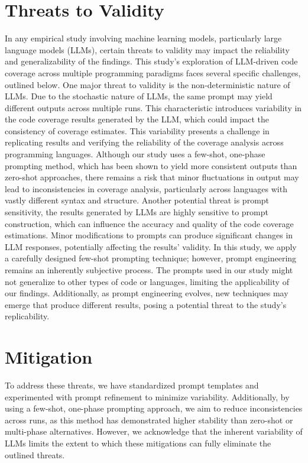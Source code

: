 \documentclass[sigconf]{acmart}
\begin{document}
\section{Threats to Validity}
In any empirical study involving machine learning models, particularly large language models (LLMs), certain threats to validity may impact the reliability and generalizability of the findings. This study’s exploration of LLM-driven code coverage across multiple programming paradigms faces several specific challenges, outlined below. One major threat to validity is the non-deterministic nature of LLMs. Due to the stochastic nature of LLMs, the same prompt may yield different outputs across multiple runs. This characteristic introduces variability in the code coverage results generated by the LLM, which could impact the consistency of coverage estimates. This variability presents a challenge in replicating results and verifying the reliability of the coverage analysis across programming languages. Although our study uses a few-shot, one-phase prompting method, which has been shown to yield more consistent outputs than zero-shot approaches, there remains a risk that minor fluctuations in output may lead to inconsistencies in coverage analysis, particularly across languages with vastly different syntax and structure. Another potential threat is prompt sensitivity, the results generated by LLMs are highly sensitive to prompt construction, which can influence the accuracy and quality of the code coverage estimations. Minor modifications to prompts can produce significant changes in LLM responses, potentially affecting the results’ validity. In this study, we apply a carefully designed few-shot prompting technique; however, prompt engineering remains an inherently subjective process. The prompts used in our study might not generalize to other types of code or languages, limiting the applicability of our findings. Additionally, as prompt engineering evolves, new techniques may emerge that produce different results, posing a potential threat to the study’s replicability.

\section{Mitigation}
To address these threats, we have standardized prompt templates and experimented with prompt refinement to minimize variability. Additionally, by using a few-shot, one-phase prompting approach, we aim to reduce inconsistencies across runs, as this method has demonstrated higher stability than zero-shot or multi-phase alternatives. However, we acknowledge that the inherent variability of LLMs limits the extent to which these mitigations can fully eliminate the outlined threats.
\end{document}
